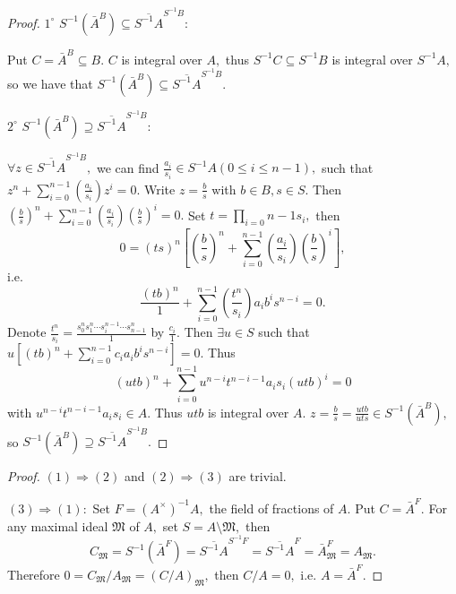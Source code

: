 \begin{proof}
$\mathit{1^{\circ}}$ $S^{-1}(\bar{A}^B)\subseteq
\overline{S^{-1}A}^{S^{-1}B}:$

Put $C=\bar{A}^B\subseteq B.$ $C$ is integral over $A,$ thus
$S^{-1}C\subseteq S^{-1}B$ is integral over $S^{-1}A,$ so we have
that $S^{-1}(\bar{A}^B)\subseteq \overline{S^{-1}A}^{S^{-1}B}.$

$\mathit{2^{\circ}}$ $S^{-1}(\bar{A}^B)\supseteq
\overline{S^{-1}A}^{S^{-1}B}:$

$\forall z\in \overline{S^{-1}A}^{S^{-1}B},$ we can find
$\frac{a_i}{s_i}\in S^{-1}A(0\leqslant i\leqslant n-1),$ such that
$z^n+\sum\limits_{i=0}^{n-1}(\frac{a_i}{s_i})z^i=0.$ Write
$z=\frac{b}{s}$ with $b\in B, s\in S.$ Then $(\frac{b}{s})^n +
\sum\limits_{i=0}^{n-1}(\frac{a_i}{s_i})(\frac{b}{s})^i=0.$ Set
$t=\prod\limits_{i=0}{n-1}s_i,$ then
$$0 = (ts)^n[(\frac{b}{s})^n +
\sum\limits_{i=0}^{n-1}(\frac{a_i}{s_i})(\frac{b}{s})^i],$$ i.e.
$$\frac{(tb)^n}{1} +
\sum\limits_{i=0}^{n-1}(\frac{t^n}{s_i})a_ib^is^{n-i}=0.$$ Denote
$\frac{t^n}{s_i} = \frac{s_0^ns_1^n\cdots s_i^{n-1}\cdots
s_{n-1}^n}{1}$ by $\frac{c_i}{1}.$ Then $\exists u\in S$ such that
$u[(tb)^n + \sum\limits_{i=0}^{n-1}c_ia_ib^is^{n-i}]=0.$ Thus
$$(utb)^n + \sum\limits_{i=0}^{n-1}u^{n-i}t^{n-i-1}a_is_i(utb)^i=0$$
with $u^{n-i}t^{n-i-1}a_is_i\in A.$ Thus $utb$ is integral over $A.$
$z=\frac{b}{s}=\frac{utb}{uts}\in S^{-1}(\bar{A}^B),$ so
$S^{-1}(\bar{A}^B)\supseteq \overline{S^{-1}A}^{S^{-1}B}.$
\end{proof}
\begin{proof}
$(1)\Longrightarrow(2)$ and $(2)\Longrightarrow(3)$ are trivial.

$(3)\Longrightarrow(1):$ Set $F=(A^{\times})^{-1}A,$ the field of
fractions of $A.$ Put $C=\bar{A}^F.$ For any maximal ideal
$\mathfrak{M}$ of $A,$ set $S=A\setminus \mathfrak{M},$ then
$$C_{\mathfrak{M}} = S^{-1}(\bar{A}^F) = \overline{S^{-1}A}^{S^{-1}F}
= \overline{S^{-1}A}^F = \bar{A}_{\mathfrak{M}}^F =
A_{\mathfrak{M}}.$$ Therefore $0 =C_{\mathfrak{M}}/A_{\mathfrak{M}}
= (C/A)_{\mathfrak{M}},$ then $C/A=0,$ i.e. $A=\bar{A}^F.$
\end{proof}
